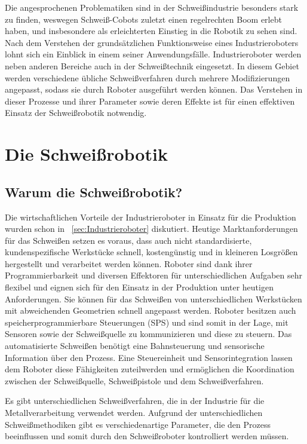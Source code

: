 Die angesprochenen Problematiken sind in der Schweißindustrie besonders stark zu finden, weswegen Schweiß-Cobots zuletzt einen regelrechten Boom erlebt haben, und insbesondere als erleichterten Einstieg in die Robotik zu sehen sind. Nach dem Verstehen der grundsätzlichen Funktionsweise eines Industrieroboters lohnt sich ein Einblick in einem seiner Anwendungsfälle. Industrieroboter werden neben anderen Bereiche auch in der Schweißtechnik eingesetzt. In diesem Gebiet werden verschiedene übliche Schweißverfahren durch mehrere Modifizierungen angepasst, sodass sie durch Roboter ausgeführt werden können. Das Verstehen in dieser Prozesse und ihrer Parameter sowie deren Effekte ist für einen effektiven Einsatz der Schweißrobotik notwendig.

\section{Die Schweißrobotik}

\subsection{Warum die Schweißrobotik?}
Die wirtschaftlichen Vorteile der Industrieroboter in Einsatz für die Produktion wurden schon in ~\ref{sec:Industrieroboter} diskutiert. Heutige Marktanforderungen für das Schweißen setzen es voraus, dass auch nicht standardisierte, kundenspezifische Werkstücke schnell, kostengünstig und in kleineren Losgrößen hergestellt und verarbeitet werden können. Roboter sind dank ihrer Programmierbarkeit und diversen Effektoren für unterschiedlichen Aufgaben sehr flexibel und eignen sich für den Einsatz in der Produktion unter heutigen Anforderungen. Sie können für das Schweißen von unterschiedlichen Werkstücken mit abweichenden Geometrien schnell angepasst werden. Roboter besitzen auch speicherprogrammierbare Steuerungen (SPS) und sind somit in der Lage, mit Sensoren sowie der Schweißquelle zu kommunizieren und diese zu steuern. Das automatisierte Schweißen benötigt eine Bahnsteuerung und sensorische Information über den Prozess. Eine Steuereinheit und Sensorintegration lassen dem Roboter diese Fähigkeiten zuteilwerden und ermöglichen die Koordination zwischen der Schweißquelle, Schweißpistole und dem Schweißverfahren. \autocite[17-22]{Pires_WeldingRobots_2006}

Es gibt unterschiedlichen Schweißverfahren, die in der Industrie für die Metallverarbeitung verwendet werden. Aufgrund der unterschiedlichen Schweißmethodiken gibt es verschiedenartige Parameter, die den Prozess beeinflussen und somit durch den Schweißroboter kontrolliert werden müssen.


